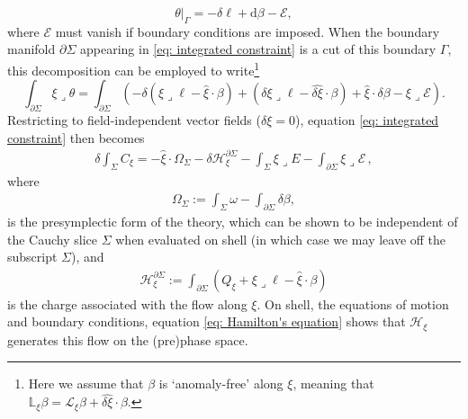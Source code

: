 \documentclass[]{jkpaper}
\theoremstyle{plain}
\theoremstyle{definition}
\newcommand{\sins}{\mathop{\lrcorner}}
\newcommand{\fins}{\cdot}
\newcommand{\sd}{\mathrm {d}}
\newcommand{\fd}{\delta}
\newcommand{\sL}{\mathcal{L}}
\newcommand{\fL}{\mathbb{L}}
\begin{document}
\begin{equation}\label{eq: theta decomposition}
    \theta|_\Gamma=-\fd\ell +\sd \beta -\mathcal{E},
\end{equation}
where $\mathcal{E}$ must vanish if boundary conditions are imposed.  When the boundary manifold $\partial\Sigma$ appearing in \eqref{eq: integrated constraint} is a cut of this boundary $\Gamma$, this decomposition can be employed to write\footnote{Here we assume that $\beta$ is `anomaly-free' along $\xi$, meaning that $\fL_\xi\beta = \sL_\xi \beta+\widehat{\fd\xi}\fins\beta$.}
\begin{equation}\label{eq: boundary integral decomposition}
    \int_{\partial\Sigma}\xi\sins \theta=
     \int_{\partial\Sigma}\left(-\fd(\xi\sins\ell-\hat{\xi}\fins\beta)+(\fd\xi\sins\ell-\widehat{\fd\xi}\fins\beta)+\hat{\xi}\fins\fd\beta-\xi\sins\mathcal{E}\right).
\end{equation}
Restricting to field-independent vector fields ($\delta\xi=0$), equation \eqref{eq: integrated constraint} then becomes
\begin{equation}\begin{split}\label{eq: Hamilton's equation}
    \fd \int_\Sigma C_\xi =
    -\hat{\xi}\fins\Omega_\Sigma
    -\fd \mathcal{H}_\xi^{\partial \Sigma}
    -\int_{\Sigma}\xi\sins E 
    -\int_{\partial\Sigma}\xi\sins\mathcal{E}\, ,
\end{split}\end{equation}
where
\begin{equation}\begin{split}\label{eq: full symplectic form}
    \Omega_\Sigma :=\int_\Sigma\omega - \int_{\partial\Sigma}\delta\beta,
\end{split}\end{equation}
is the presymplectic form of the theory, which can be shown to be independent of the Cauchy slice $\Sigma$ when evaluated on shell (in which case we may leave off the subscript $\Sigma$), and
\begin{equation}\begin{split}\label{eq: full charge}
    \mathcal{H}_\xi^{\partial \Sigma} :=\int_{\partial \Sigma}\left(Q_\xi+\xi\sins\ell-\hat{\xi}\fins\beta\right)
\end{split}\end{equation}
is the charge associated with the flow along $\xi$.  On shell, the equations of motion and boundary conditions, equation \eqref{eq: Hamilton's equation} shows that $\mathcal{H}_\xi$ generates this flow on the (pre)phase space.
\end{document}
